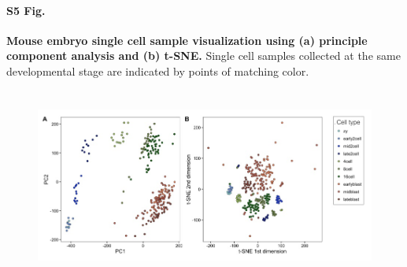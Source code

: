 \documentclass[10pt,letterpaper]{article}
\begin{document}
\paragraph*{S5 Fig.}

\label{figS5}
{\bf Mouse embryo single cell sample visualization using (a) principle component analysis and (b) t-SNE.}
Single cell samples collected at the same developmental stage are indicated by points of matching color.
\begin{figure}[ht]
\centering
\includegraphics[height=2.5in, width=6.5in]{../../src/figure/deng-pca-vs-tsne.Rmd/deng-with-legend.jpeg}
\end{figure}
\end{document}
